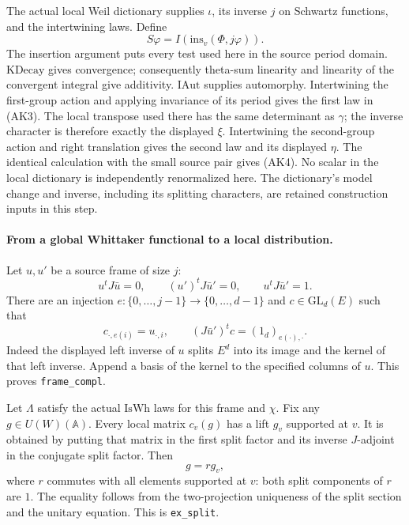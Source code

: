 The actual local Weil dictionary supplies \(\iota\), its inverse
\(j\) on Schwartz functions, and the intertwining laws.
Define
\[
                  S\varphi=I(\mathrm{ins}_v(\Phi,j\varphi)).
 \tag{AK5}\label{eq:sr-source-local-period-construction}
\]
The insertion argument puts every test used here in the source
period domain. \(\mathrm{KDecay}\) gives convergence; consequently
theta-sum linearity and linearity of the convergent integral give
additivity. \(\mathrm{IAut}\) supplies automorphy.
Intertwining the first-group action and applying invariance of its
period gives the first law in (AK3). The local transpose used there
has the same determinant as \(\gamma\); the inverse character is
therefore exactly the displayed \(\xi\).
Intertwining the second-group action and right translation gives
the second law and its displayed \(\eta\).
The identical calculation with the small source pair gives (AK4).
No scalar in the local dictionary is independently renormalized here.
The dictionary's model change and inverse, including its splitting
characters, are retained construction inputs in this step.

\paragraph{From a global Whittaker functional to a local distribution.}
Let \(u,u'\) be a source frame of size \(j\):
\[
 u^tJ\bar u=0,\qquad (u')^tJ\bar u'=0,\qquad u^tJ\bar u'=1.
\]
There are an injection \(e:\{0,\ldots,j-1\}\to\{0,\ldots,d-1\}\)
and \(c\in\mathrm{GL}_d(E)\) such that
\[
 c_{\cdot,e(i)}=u_{\cdot,i},\qquad
 (J\bar u')^t c=(1_d)_{e(\cdot),\cdot}.
 \tag{AK6}\label{eq:sr-source-frame-complement}
\]
Indeed the displayed left inverse of \(u\) splits \(E^d\) into
its image and the kernel of that left inverse. Append a basis of
the kernel to the specified columns of \(u\).
This proves \texttt{frame\_compl}.

Let \(\Lambda\) satisfy the actual \(\mathrm{IsWh}\) laws for this
frame and \(\chi\). Fix any \(g\in U(W)(\mathbb A)\).
Every local matrix \(c_v(g)\) has a lift \(g_v\) supported at \(v\).
It is obtained by putting that matrix in the first split factor
and its inverse \(J\)-adjoint in the conjugate split factor.
Then
\[
                       g=r g_v,
\]
where \(r\) commutes with all elements supported at \(v\):
both split components of \(r\) are \(1\).
The equality follows from the two-projection uniqueness of the split
section and the unitary equation. This is \texttt{ex\_split}.

